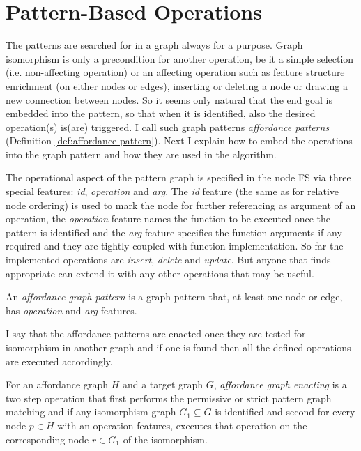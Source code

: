 \section{Pattern-Based Operations}
\label{sec:pattern-based-operations}
The patterns are searched for in a graph always for a purpose. Graph isomorphism is only a precondition for another operation, be it a simple selection (i.e. non-affecting operation) or an affecting operation such as feature structure enrichment (on either nodes or edges), inserting or deleting a node or drawing a new connection between nodes. So it seems only natural that the end goal is embedded into the pattern, so that when it is identified, also the desired operation(s) is(are) triggered. I call such graph patterns \textit{affordance patterns} (Definition \ref{def:affordance-pattern}). Next I explain how to embed the operations into the graph pattern and how they are used in the algorithm. 

The operational aspect of the pattern graph is specified in the node FS via three special features: \textit{id}, \textit{operation} and \textit{arg}. The \textit{id} feature (the same as for relative node ordering) is used to mark the node for further referencing as argument of an operation, the \textit{operation} feature names the function to be executed once the pattern is identified and the \textit{arg} feature specifies the function arguments if any required and they are tightly coupled with function implementation. So far the implemented operations are \textit{insert}, \textit{delete} and \textit{update}. But anyone that finds appropriate can extend it with any other operations that may be useful.

\begin{definition}\label{def:affordance-pattern}
	An \textit{affordance graph pattern } is a graph pattern that, at least one node or edge, has \textit{operation} and \textit{arg} features.
\end{definition}

I say that the affordance patterns are enacted once they are tested for isomorphism in another graph and if one is found then all the defined operations are executed accordingly.

\begin{definition}\label{def:enacted-pattern}
	For an affordance graph $H$ and a target graph $G$, \textit{affordance graph enacting} is a two step operation that first performs the permissive or strict pattern graph matching and if any isomorphism graph $G_{1} \subseteq G$ is identified and second for every node $p \in H$ with an operation features, executes that operation on the corresponding node $r \in G_{1}$ of the isomorphism.  
\end{definition}

